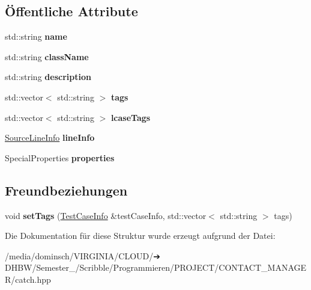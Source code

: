 \subsection*{Öffentliche Attribute}
\begin{DoxyCompactItemize}
\item 
\mbox{\label{structCatch_1_1TestCaseInfo_a463794e2f5cfead307c93efd134ade36}} 
std\+::string {\bfseries name}
\item 
\mbox{\label{structCatch_1_1TestCaseInfo_a1a5e0825132a38d091defdebbf2f8ce9}} 
std\+::string {\bfseries class\+Name}
\item 
\mbox{\label{structCatch_1_1TestCaseInfo_a37fe2db9425bc45f6a33893eac31198e}} 
std\+::string {\bfseries description}
\item 
\mbox{\label{structCatch_1_1TestCaseInfo_a150a7cbca1dd0c91799ccb14ff822eb0}} 
std\+::vector$<$ std\+::string $>$ {\bfseries tags}
\item 
\mbox{\label{structCatch_1_1TestCaseInfo_a844e3de9baf6e53cadfba9733c236bfe}} 
std\+::vector$<$ std\+::string $>$ {\bfseries lcase\+Tags}
\item 
\mbox{\label{structCatch_1_1TestCaseInfo_aa9407b7f442655b51a2aad24b3fa2fd3}} 
\hyperlink{structCatch_1_1SourceLineInfo}{Source\+Line\+Info} {\bfseries line\+Info}
\item 
\mbox{\label{structCatch_1_1TestCaseInfo_afc1e84bd7a2e180895a06d9131302af0}} 
Special\+Properties {\bfseries properties}
\end{DoxyCompactItemize}
\subsection*{Freundbeziehungen}
\begin{DoxyCompactItemize}
\item 
\mbox{\label{structCatch_1_1TestCaseInfo_a0fe44abaf18ae7c26f98a9fc2b08679c}} 
void {\bfseries set\+Tags} (\hyperlink{structCatch_1_1TestCaseInfo}{Test\+Case\+Info} \&test\+Case\+Info, std\+::vector$<$ std\+::string $>$ tags)
\end{DoxyCompactItemize}


Die Dokumentation für diese Struktur wurde erzeugt aufgrund der Datei\+:\begin{DoxyCompactItemize}
\item 
/media/dominsch/\+V\+I\+R\+G\+I\+N\+I\+A/\+C\+L\+O\+U\+D/➔ D\+H\+B\+W/\+Semester\+\_/\+Scribble/\+Programmieren/\+P\+R\+O\+J\+E\+C\+T/\+C\+O\+N\+T\+A\+C\+T\+\_\+\+M\+A\+N\+A\+G\+E\+R/catch.\+hpp\end{DoxyCompactItemize}
